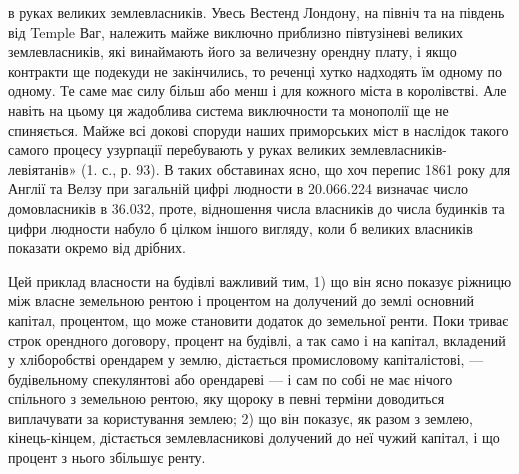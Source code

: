 \parcont{}  %
в руках великих землевласників. Увесь Вестенд Лондону, на північ та на південь
від Temple Ваг, належить майже виключно приблизно півтузіневі великих
землевласників, які винаймають його за величезну орендну плату, і якщо
контракти ще подекуди не закінчились, то реченці хутко надходять їм одному по
одному. Те саме має силу більш або менш і для кожного міста в королівстві. Але
навіть на цьому ця жадоблива система виключности та монополії ще не спиняється. Майже всі докові
споруди наших приморських міст в наслідок такого
самого процесу узурпації перебувають у руках великих землевласників-левіятанів» (1. с., р. 93). В
таких обставинах ясно, що хоч перепис 1861 року для
Англії та Велзу при загальній цифрі людности в 20.066.224 визначає число
домовласників в 36.032, проте, відношення числа власників до числа будинків
та цифри людности набуло б цілком іншого вигляду, коли б великих власників
показати окремо від дрібних.

Цей приклад власности на будівлі важливий тим, 1) що він ясно показує
ріжницю між власне земельною рентою і процентом на долучений до землі
основний капітал, процентом, що може становити додаток до земельної ренти.
Поки триває строк орендного договору, процент на будівлі, а так само і на
капітал, вкладений у хліборобстві орендарем у землю, дістається промисловому капіталістові, —
будівельному спекулянтові або орендареві — і сам по собі
не має нічого спільного з земельною рентою, яку щороку в певні терміни доводиться виплачувати за
користування землею; 2) що він показує, як разом з
землею, кінець-кінцем, дістається землевласникові долучений до неї чужий капітал, і що процент з
нього збільшує ренту.

